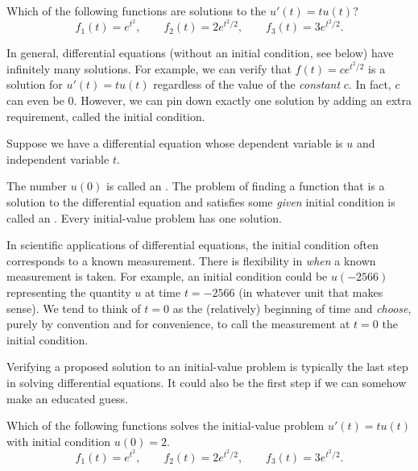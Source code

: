 \documentclass[../main.tex]{subfiles}
\begin{document}
\begin{example}
  Which of the following functions are solutions to the \(u'(t) = t u(t)\)?
  \[
    f_{1}(t) = e^{t^{2}}, \qquad f_{2}(t) = 2e^{t^{2}/2}, \qquad f_{3}(t) = 3e^{t^{2}/2}.
  \]
\end{example}
\clearpage

In general, differential equations (without an initial condition, see below) have infinitely many solutions. For example, we can verify that \(f(t) = c e^{t^{2}/2}\) is a solution for \(u'(t) = t u(t)\) regardless of the value of the \emph{constant} \(c\). In fact, \(c\) can even be \(0\).  However, we can pin down exactly one solution by adding an extra requirement, called the initial condition.

\begin{definition}
  Suppose we have a differential equation whose dependent variable is \(u\) and independent variable \(t\). 

  The number \(u(0)\) is called an .  The problem of finding a function that is a solution to the differential equation and satisfies some \emph{given} initial condition is called an . Every initial-value problem has  one solution. 
\end{definition}

\faPencil*{} In scientific applications of differential equations, the initial condition often corresponds to a known measurement. There is flexibility in \emph{when} a known measurement is taken. For example, an initial condition could be \(u(-2566)\) representing the quantity \(u\) at time \(t = -2566\) (in whatever unit that makes sense).  We tend to think of \(t = 0\) as the (relatively) beginning of time and \emph{choose}, purely by convention and for convenience, to call the measurement at \(t = 0\) the initial condition.

\bigskip
Verifying a proposed solution to an initial-value problem is typically the last step in solving differential equations. It could also be the first step if we can somehow make an educated guess.
\begin{example}
  Which of the following functions solves the initial-value problem \(u'(t) = t u(t)\) with initial condition \(u(0) = 2\).
  \[
    f_{1}(t) = e^{t^{2}}, \qquad f_{2}(t) = 2e^{t^{2}/2}, \qquad f_{3}(t) = 3e^{t^{2}/2}.
  \]
\end{example}
\clearpage
\end{document}

